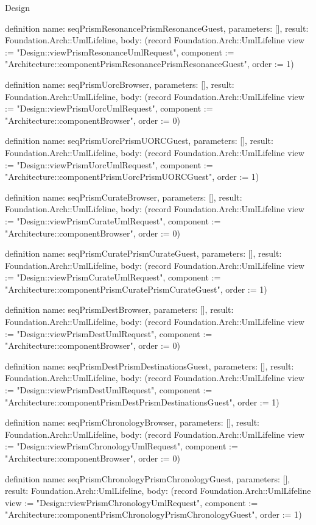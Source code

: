 \begin{lexlean}{Design}
\begin{semanticmodule}
definition{
  name: seqPrismResonancePrismResonanceGuest,
  parameters: [],
  result: Foundation.Arch::UmlLifeline,
  body: (record Foundation.Arch::UmlLifeline {view := "Design::viewPrismResonanceUmlRequest", component := "Architecture::componentPrismResonancePrismResonanceGuest", order := 1})
}

definition{
  name: seqPrismUorcBrowser,
  parameters: [],
  result: Foundation.Arch::UmlLifeline,
  body: (record Foundation.Arch::UmlLifeline {view := "Design::viewPrismUorcUmlRequest", component := "Architecture::componentBrowser", order := 0})
}

definition{
  name: seqPrismUorcPrismUORCGuest,
  parameters: [],
  result: Foundation.Arch::UmlLifeline,
  body: (record Foundation.Arch::UmlLifeline {view := "Design::viewPrismUorcUmlRequest", component := "Architecture::componentPrismUorcPrismUORCGuest", order := 1})
}

definition{
  name: seqPrismCurateBrowser,
  parameters: [],
  result: Foundation.Arch::UmlLifeline,
  body: (record Foundation.Arch::UmlLifeline {view := "Design::viewPrismCurateUmlRequest", component := "Architecture::componentBrowser", order := 0})
}

definition{
  name: seqPrismCuratePrismCurateGuest,
  parameters: [],
  result: Foundation.Arch::UmlLifeline,
  body: (record Foundation.Arch::UmlLifeline {view := "Design::viewPrismCurateUmlRequest", component := "Architecture::componentPrismCuratePrismCurateGuest", order := 1})
}

definition{
  name: seqPrismDestBrowser,
  parameters: [],
  result: Foundation.Arch::UmlLifeline,
  body: (record Foundation.Arch::UmlLifeline {view := "Design::viewPrismDestUmlRequest", component := "Architecture::componentBrowser", order := 0})
}

definition{
  name: seqPrismDestPrismDestinationsGuest,
  parameters: [],
  result: Foundation.Arch::UmlLifeline,
  body: (record Foundation.Arch::UmlLifeline {view := "Design::viewPrismDestUmlRequest", component := "Architecture::componentPrismDestPrismDestinationsGuest", order := 1})
}

definition{
  name: seqPrismChronologyBrowser,
  parameters: [],
  result: Foundation.Arch::UmlLifeline,
  body: (record Foundation.Arch::UmlLifeline {view := "Design::viewPrismChronologyUmlRequest", component := "Architecture::componentBrowser", order := 0})
}

definition{
  name: seqPrismChronologyPrismChronologyGuest,
  parameters: [],
  result: Foundation.Arch::UmlLifeline,
  body: (record Foundation.Arch::UmlLifeline {view := "Design::viewPrismChronologyUmlRequest", component := "Architecture::componentPrismChronologyPrismChronologyGuest", order := 1})
}


\end{semanticmodule}
\end{lexlean}

